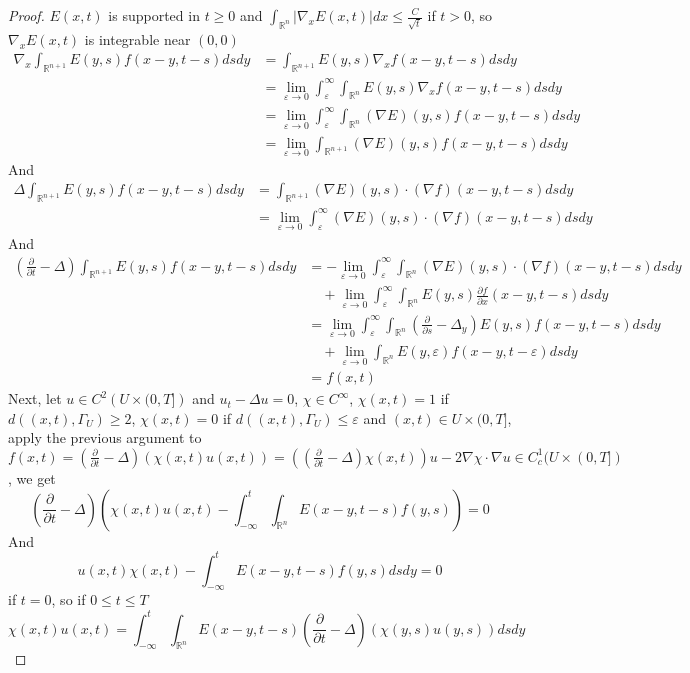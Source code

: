 \documentclass[main]{subfiles}
\begin{document}
\begin{proof}
$E(x,t)$ is supported in $t\geq0$ and $\displaystyle\int_{\mathbb R^n}|\nabla_xE(x,t)|dx\leq\frac{C}{\sqrt{t}}$ if $t>0$, so $\nabla_xE(x,t)$ is integrable near $(0,0)$
\begin{align*}
\nabla_x\int_{\mathbb R^{n+1}}E(y,s)f(x-y,t-s)dsdy&=\int_{\mathbb R^{n+1}}E(y,s)\nabla_xf(x-y,t-s)dsdy \\
&=\lim_{\varepsilon\to0}\int_\varepsilon^\infty\int_{\mathbb R^n}E(y,s)\nabla_xf(x-y,t-s)dsdy \\
&=\lim_{\varepsilon\to0}\int_\varepsilon^\infty\int_{\mathbb R^n}(\nabla E)(y,s)f(x-y,t-s)dsdy \\
&=\lim_{\varepsilon\to0}\int_{\mathbb R^{n+1}}(\nabla E)(y,s)f(x-y,t-s)dsdy
\end{align*}
And
\begin{align*}
\Delta\int_{\mathbb R^{n+1}}E(y,s)f(x-y,t-s)dsdy&=\int_{\mathbb R^{n+1}}(\nabla E)(y,s)\cdot(\nabla f)(x-y,t-s)dsdy \\
&=\lim_{\varepsilon\to0}\int_\varepsilon^\infty(\nabla E)(y,s)\cdot(\nabla f)(x-y,t-s)dsdy
\end{align*}
And
\begin{align*}
\left(\frac{\partial}{\partial t}-\Delta\right)\int_{\mathbb R^{n+1}}E(y,s)f(x-y,t-s)dsdy&=-\lim_{\varepsilon\to0}\int_\varepsilon^\infty\int_{\mathbb R^{n}}(\nabla E)(y,s)\cdot(\nabla f)(x-y,t-s)dsdy \\
&\quad+\lim_{\varepsilon\to0}\int_\varepsilon^\infty\int_{\mathbb R^{n}} E(y,s)\frac{\partial f}{\partial x}(x-y,t-s)dsdy \\
&=\lim_{\varepsilon\to0}\int_\varepsilon^\infty\int_{\mathbb R^{n}}\left(\frac{\partial}{\partial s}-\Delta_y\right)E(y,s)f(x-y,t-s)dsdy \\
&\quad+\lim_{\varepsilon\to0}\int_{\mathbb R^{n}}E(y,\varepsilon)f(x-y,t-\varepsilon)dsdy \\
&=f(x,t)
\end{align*}
Next, let $u\in C^2\left(U\times (0,T]\right)$ and $u_t-\Delta u=0$, $\chi\in C^\infty$, $\chi(x,t)=1$ if $d((x,t),\Gamma_U)\geq2$, $\chi(x,t)=0$ if $d((x,t),\Gamma_U)\leq\varepsilon$ and $(x,t)\in U\times(0,T]$, apply the previous argument to $\displaystyle f(x,t)=\left(\frac{\partial}{\partial t}-\Delta\right)(\chi(x,t)u(x,t))=\left(\left(\frac{\partial}{\partial t}-\Delta\right)\chi(x,t)\right)u-2\nabla\chi\cdot\nabla u\in C_c^1(U\times(0,T])$, we get
\[\left(\frac{\partial}{\partial t}-\Delta\right)\left(\chi(x,t)u(x,t)-\int_{-\infty}^t\int_{\mathbb R^n}E(x-y,t-s)f(y,s)\right)=0\]
And
\[u(x,t)\chi(x,t)-\int_{-\infty}^tE(x-y,t-s)f(y,s)dsdy=0\]
if $t=0$, so if $0\leq t\leq T$
\[\chi(x,t)u(x,t)=\int_{-\infty}^t\int_{\mathbb R^n}E(x-y,t-s)\left(\frac{\partial}{\partial t}-\Delta\right)(\chi(y,s)u(y,s))dsdy\]
\end{proof}
\end{document}
